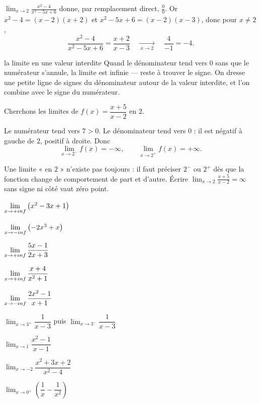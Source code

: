 \begin{exemple}
$\displaystyle\lim_{x \to 2} \frac{x^{2}-4}{x^{2}-5x+6}$ donne, par
remplacement direct, $\frac00$. Or
$x^{2}-4 = (x-2)(x+2)$ et $x^{2}-5x+6 = (x-2)(x-3)$, donc pour $x \neq 2$,
\[
  \frac{x^{2}-4}{x^{2}-5x+6} = \frac{x+2}{x-3}
  \quad \xrightarrow[\;x \to 2\;]{} \quad \frac{4}{-1} = -4 .
\]
\end{exemple}

\begin{methode}{la limite en une valeur interdite}
Quand le dénominateur tend vers $0$ sans que le numérateur s'annule, la
limite est infinie — reste à trouver le signe. On dresse une petite ligne de
signes du dénominateur autour de la valeur interdite, et l'on combine avec
le signe du numérateur.
\end{methode}

\begin{exemple}
Cherchons les limites de $f(x) = \dfrac{x+5}{x-2}$ en $2$.

Le numérateur tend vers $7 > 0$. Le dénominateur tend vers $0$ : il est
négatif à gauche de $2$, positif à droite. Donc
\[
  \lim_{x \to 2^{-}} f(x) = -\infty, \qquad
  \lim_{x \to 2^{+}} f(x) = +\infty .
\]
\end{exemple}

\begin{erreurclassique}
Une limite « en $2$ » n'existe pas toujours : il faut préciser $2^{-}$ ou
$2^{+}$ dès que la fonction change de comportement de part et d'autre.
Écrire $\displaystyle\lim_{x\to2} \frac{x+5}{x-2} = \infty$ sans signe ni
côté vaut zéro point.
\end{erreurclassique}

\begin{entrainement}
\exo[\niveau{1}] $\limpinf \left(x^{2}-3x+1\right)$

\exo[\niveau{1}] $\limminf \left(-2x^{3}+x\right)$

\exo[\niveau{1}] $\limpinf \dfrac{5x-1}{2x+3}$

\exo[\niveau{2}] $\limpinf \dfrac{x+4}{x^{2}+1}$

\exo[\niveau{2}] $\limminf \dfrac{2x^{2}-1}{x+1}$

\exo[\niveau{2}] $\displaystyle\lim_{x \to 3^{+}} \dfrac{1}{x-3}$ puis
$\displaystyle\lim_{x \to 3^{-}} \dfrac{1}{x-3}$

\exo[\niveau{2}] $\displaystyle\lim_{x \to 1} \dfrac{x^{2}-1}{x-1}$

\exo[\niveau{3}] $\displaystyle\lim_{x \to -2} \dfrac{x^{2}+3x+2}{x^{2}-4}$

\exo[\niveau{3}] $\displaystyle\lim_{x \to 0^{+}}
\left(\dfrac{1}{x}-\dfrac{1}{x^{2}}\right)$
\end{entrainement}

